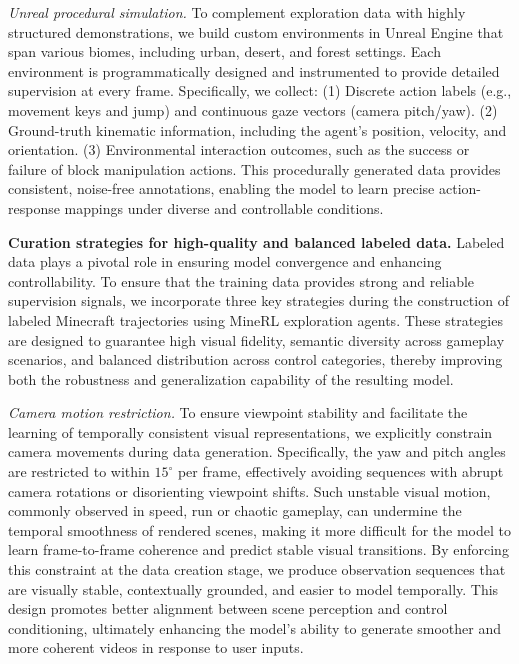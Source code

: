 \documentclass{article}
\begin{document}
\textit{Unreal procedural simulation.}
To complement exploration data with highly structured demonstrations, we build custom environments in Unreal Engine that span various biomes, including urban, desert, and forest settings. Each environment is programmatically designed and instrumented to provide detailed supervision at every frame. Specifically, we collect: (1) Discrete action labels (e.g., movement keys and jump) and continuous gaze vectors (camera pitch/yaw).
(2) Ground-truth kinematic information, including the agent’s position, velocity, and orientation.
(3) Environmental interaction outcomes, such as the success or failure of block manipulation actions. This procedurally generated data provides consistent, noise-free annotations, enabling the model to learn precise action-response mappings under diverse and controllable conditions.

\textbf{Curation strategies for high-quality and balanced labeled data.}
Labeled data plays a pivotal role in ensuring model convergence and enhancing controllability.  To ensure that the training data provides strong and reliable supervision signals, we incorporate three key strategies during the construction of labeled Minecraft trajectories using MineRL exploration agents. These strategies are designed to guarantee high visual fidelity, semantic diversity across gameplay scenarios, and balanced distribution across control categories, thereby improving both the robustness and generalization capability of the resulting model.

\textit{Camera motion restriction.}
To ensure viewpoint stability and facilitate the learning of temporally consistent visual representations, we explicitly constrain camera movements during data generation. Specifically, the yaw and pitch angles are restricted to within $15^\circ$ per frame, effectively avoiding sequences with abrupt camera rotations or disorienting viewpoint shifts. Such unstable visual motion, commonly observed in speed, run or chaotic gameplay, can undermine the temporal smoothness of rendered scenes, making it more difficult for the model to learn frame-to-frame coherence and predict stable visual transitions.
By enforcing this constraint at the data creation stage, we produce observation sequences that are visually stable, contextually grounded, and easier to model temporally. This design promotes better alignment between scene perception and control conditioning, ultimately enhancing the model’s ability to generate smoother and more coherent videos in response to user inputs.
\end{document}
